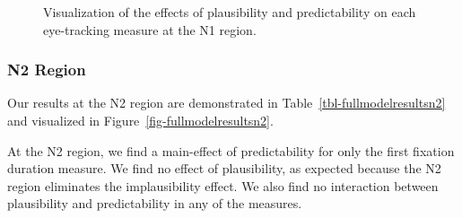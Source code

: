 \documentclass[
  12pt,
  letterpaper,
]{scrreprt}
\begin{document}
\begin{figure}[htbp]

\caption{\label{fig-fullmodelresultsn1}Visualization of the effects of
plausibility and predictability on each eye-tracking measure at the N1
region.}


\end{figure}%

\subsubsection{N2 Region}\label{n2-region-1}

Our results at the N2 region are demonstrated in
Table~\ref{tbl-fullmodelresultsn2} and visualized in
Figure~\ref{fig-fullmodelresultsn2}.

At the N2 region, we find a main-effect of predictability for only the
first fixation duration measure. We find no effect of plausibility, as
expected because the N2 region eliminates the implausibility effect. We
also find no interaction between plausibility and predictability in any
of the measures.
\end{document}

